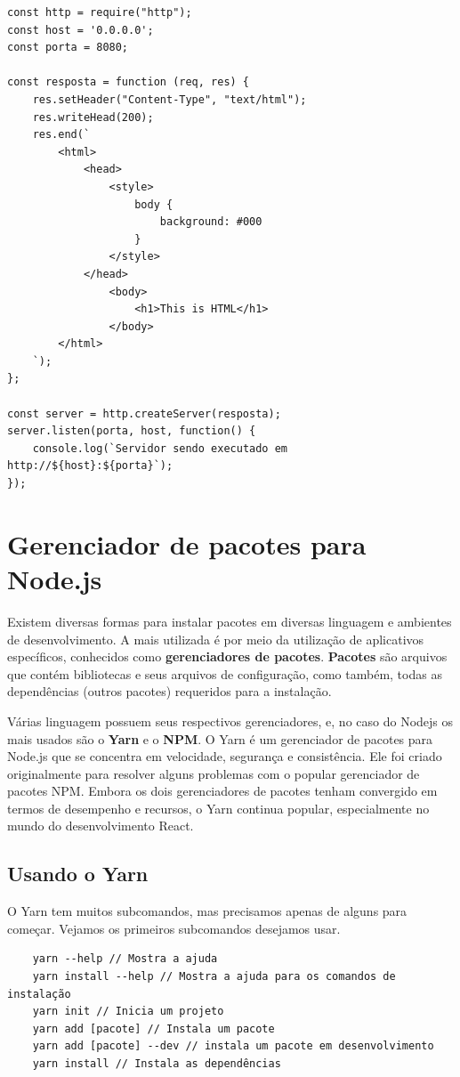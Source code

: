\begin{verbatim}
const http = require("http");
const host = '0.0.0.0';
const porta = 8080;

const resposta = function (req, res) {
	res.setHeader("Content-Type", "text/html");
	res.writeHead(200);
	res.end(`
		<html>
			<head>
				<style>
					body {
						background: #000
					}
				</style>
			</head>
				<body>
					<h1>This is HTML</h1>
				</body>
		</html>
	`);
};

const server = http.createServer(resposta);
server.listen(porta, host, function() {
	console.log(`Servidor sendo executado em http://${host}:${porta}`);
});
\end{verbatim}

\section{Gerenciador de pacotes para Node.js}

Existem diversas formas para instalar pacotes em diversas linguagem e ambientes de desenvolvimento. A mais utilizada é por meio da utilização de aplicativos específicos, conhecidos como \textbf{gerenciadores de pacotes}. \textbf{Pacotes} são arquivos que contém bibliotecas e seus arquivos de configuração, como também, todas as dependências (outros pacotes) requeridos para a instalação.

Várias linguagem possuem seus respectivos gerenciadores, e, no caso do Nodejs os mais usados são o \textbf{Yarn} e o \textbf{NPM}. O Yarn é um gerenciador de pacotes para Node.js que se concentra em velocidade, segurança e consistência. Ele foi criado originalmente para resolver alguns problemas com o popular gerenciador de pacotes NPM. Embora os dois gerenciadores de pacotes tenham convergido em termos de desempenho e recursos, o Yarn continua popular, especialmente no mundo do desenvolvimento React.

\subsection{Usando o Yarn}\label{usando_yarn}

O Yarn tem muitos subcomandos, mas precisamos apenas de alguns para começar. Vejamos os primeiros subcomandos desejamos usar.

\begin{verbatim}
	yarn --help // Mostra a ajuda
	yarn install --help // Mostra a ajuda para os comandos de instalação
	yarn init // Inicia um projeto
	yarn add [pacote] // Instala um pacote
	yarn add [pacote] --dev // instala um pacote em desenvolvimento
	yarn install // Instala as dependências
 \end{verbatim}

